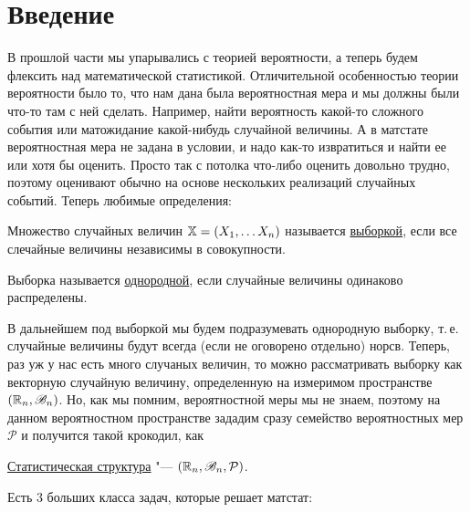 \documentclass[../TV&MS.tex]{subfiles}
\begin{document}
\section{Введение}

В прошлой части мы упарывались с теорией вероятности, а теперь будем флексить
над математической статистикой. Отличительной особенностью теории вероятности
было то, что нам дана была вероятностная мера и мы должны были что-то там с
ней сделать. Например, найти вероятность какой-то сложного события или 
матожидание какой-нибудь случайной величины. А в матстате вероятностная мера
не задана в условии, и надо как-то извратиться и найти ее или хотя бы оценить.
Просто так с потолка что-либо оценить довольно трудно, поэтому оценивают
обычно на основе нескольких реализаций случайных событий. Теперь любимые
определения:

\begin{Def}
    Множество случайных величин $\mathbb{X} = \left( X_1, \ldots X_n \right)$
    называется \uline{выборкой}, если все слечайные величины независимы в 
    совокупности.
\end{Def} 

\begin{Def}
    Выборка называется \uline{однородной}, если случайные величины одинаково
    распределены.
\end{Def} 
В дальнейшем под выборкой мы будем подразумевать однородную выборку, т.\,е.
случайные величины будут всегда (если не оговорено отдельно) норсв.
Теперь, раз уж у нас есть много случаных величин, то можно рассматривать
выборку как векторную случайную величину, определенную на измеримом
пространстве $ \left( \mathbb{R}_n, \mathscr{B}_n \right) $. Но, как мы помним,
вероятностной меры мы не знаем, поэтому на данном вероятностном пространстве
зададим сразу семейство вероятностных мер $\mathcal{P}$ и получится такой
крокодил, как

\begin{Def}
    \uline{Статистическая структура} "--- $ \left( \mathbb{R}_n, \mathscr{B}_n,
    \mathcal{P}\right) $.
\end{Def} 
Есть 3 больших класса задач, которые решает матстат:
\end{document}
